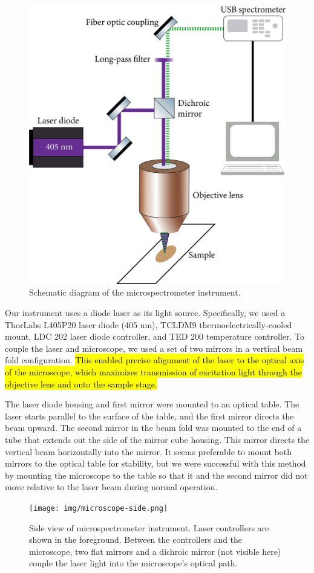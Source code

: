 \begin{figure}[h]
    \centering
    \includegraphics[width=.75\textwidth]{img/optical-diagram.png}
    \caption{Schematic diagram of the microspectrometer instrument.}
    \label{img:optical-diagram}
\end{figure}

Our instrument uses a diode laser as its light source. Specifically, we used a ThorLabs L405P20 laser diode (405 nm), TCLDM9 thermoelectrically-cooled mount, LDC 202 laser diode controller, and TED 200 temperature controller. To couple the laser and microscope, we used a set of two mirrors in a vertical beam fold configuration. \hl{This enabled precise alignment of the laser to the optical axis of the microscope, which maximizes transmission of excitation light through the objective lens and onto the sample stage.}

The laser diode housing and first mirror were mounted to an optical table. The laser starts parallel to the surface of the table, and the first mirror directs the beam upward. The second mirror in the beam fold was mounted to the end of a tube that extends out the side of the mirror cube housing. This mirror directs the vertical beam horizontally into the mirror. It seems preferable to mount both mirrors to the optical table for stability, but we were successful with this method by mounting the microscope to the table so that it and the second mirror did not move relative to the laser beam during normal operation.

\begin{figure}[H]
    \centering
    \texttt{[image: img/microscope-side.png]}
    \caption[Side view of microspectrometer instrument.]{Side view of microspectrometer instrument. Laser controllers are shown in the foreground. Between the controllers and the microscope, two flat mirrors and a dichroic mirror (not visible here) couple the laser light into the microscope's optical path.}
    \label{img:microscope-side}
\end{figure}

